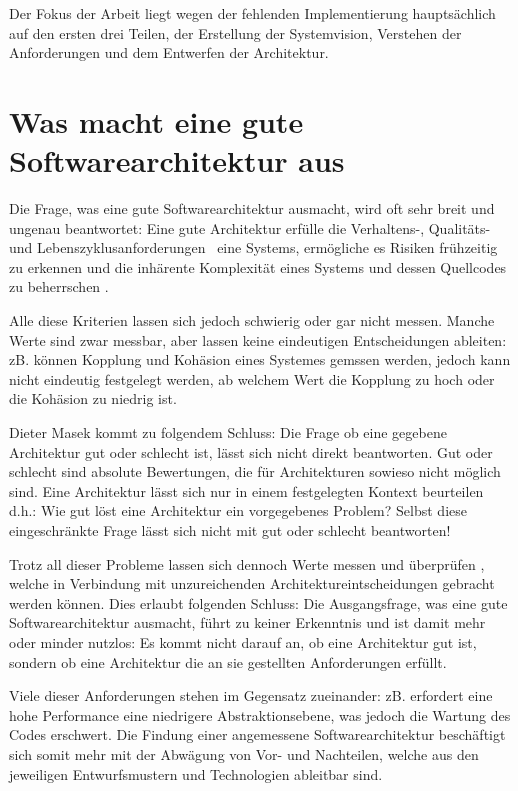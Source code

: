 Der Fokus der Arbeit liegt wegen der fehlenden Implementierung hauptsächlich auf den ersten drei Teilen, der Erstellung der Systemvision, Verstehen der Anforderungen und dem Entwerfen der Architektur.

\section{Was macht eine gute Softwarearchitektur aus}
Die Frage, was eine gute Softwarearchitektur ausmacht, wird oft sehr breit und ungenau beantwortet: Eine gute Architektur erfülle die \glqq Verhaltens-, Qualitäts- und Lebenszyklusanforderungen\grqq \ \cite[S. 12]{basiswissen} eine Systems, ermögliche es Risiken frühzeitig zu erkennen und die inhärente Komplexität eines Systems und dessen Quellcodes zu beherrschen \cite[S. 7-8]{softarch}.

Alle diese Kriterien lassen sich jedoch schwierig oder gar nicht messen. Manche Werte sind zwar messbar, aber lassen keine eindeutigen Entscheidungen ableiten: zB. können Kopplung und Kohäsion eines Systemes gemssen werden, jedoch kann nicht eindeutig festgelegt werden, ab welchem Wert die Kopplung zu hoch oder die Kohäsion zu niedrig ist.

Dieter Masek kommt zu folgendem Schluss: \glqq Die Frage ob eine gegebene Architektur gut oder schlecht ist, lässt sich nicht direkt beantworten. Gut oder schlecht sind absolute Bewertungen, die für Architekturen sowieso nicht möglich sind. Eine Architektur lässt sich nur in einem festgelegten Kontext beurteilen d.h.: Wie gut löst eine Architektur ein vorgegebenes Problem? Selbst diese eingeschränkte Frage lässt sich nicht mit gut oder schlecht beantworten! \grqq \ \cite[S. 19]{review}

Trotz all dieser Probleme lassen sich dennoch Werte messen und überprüfen \cite[S. 19]{review}, welche in Verbindung mit unzureichenden Architektureintscheidungen gebracht werden können. Dies erlaubt folgenden Schluss: Die Ausgangsfrage, was eine gute Softwarearchitektur ausmacht, führt zu keiner Erkenntnis und ist damit mehr oder minder nutzlos: Es kommt nicht darauf an, ob eine Architektur gut ist, sondern ob eine Architektur die an sie gestellten Anforderungen erfüllt.

Viele dieser Anforderungen stehen im Gegensatz zueinander: zB. erfordert eine hohe Performance eine niedrigere Abstraktionsebene, was jedoch die Wartung des Codes erschwert. Die Findung einer angemessene Softwarearchitektur beschäftigt sich somit mehr mit der Abwägung von Vor- und Nachteilen, welche aus den jeweiligen Entwurfsmustern und Technologien ableitbar sind.

